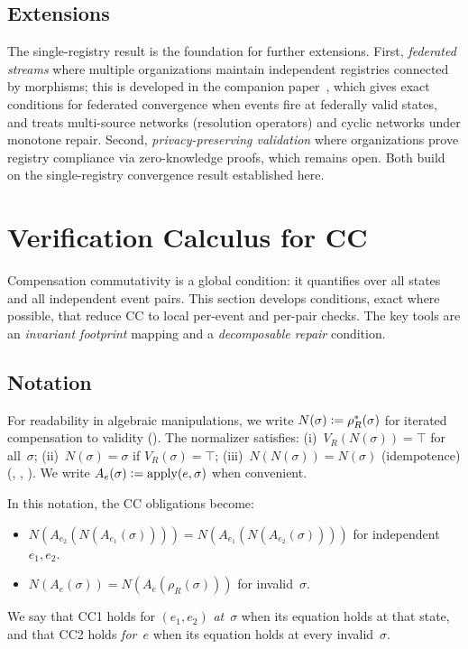 \documentclass[11pt,a4paper]{article}
\theoremstyle{plain}
\theoremstyle{definition}
\theoremstyle{remark}
\newcommand{\defeq}{\vcentcolon=}
\begin{document}
\subsection{Extensions}

The single-registry result is the foundation for further extensions.  First,
\emph{federated streams} where multiple organizations maintain independent
registries connected by morphisms; this is developed in the companion
paper~\cite{blackwell2026federated}, which gives exact conditions for
federated convergence when events fire at federally valid states, and treats
multi-source networks (resolution operators) and cyclic networks under
monotone repair.
Second, \emph{privacy-preserving validation} where organizations prove registry
compliance via zero-knowledge proofs, which remains open.  Both build on the
single-registry convergence result established here.

\section{Verification Calculus for CC}
\label{sec:calculus}

Compensation commutativity is a global condition: it quantifies over all states
and all independent event pairs.  This section develops conditions, exact
where possible, that reduce CC to local per-event and per-pair checks.  The key tools are an
\emph{invariant footprint} mapping and a \emph{decomposable repair} condition.

\subsection{Notation}

For readability in algebraic manipulations, we write
$N(\sigma) \defeq \rho_R^*(\sigma)$ for iterated compensation to validity
().  The normalizer satisfies: (i)~$V_R(N(\sigma)) = \top$
for all~$\sigma$; (ii)~$N(\sigma) = \sigma$ if $V_R(\sigma) = \top$;
(iii)~$N(N(\sigma)) = N(\sigma)$ (idempotence) (,
, ).  We write
$A_e(\sigma) \defeq \mathrm{apply}(e, \sigma)$ when convenient.

In this notation, the CC obligations become:
\begin{itemize}[leftmargin=*,nosep]
\item[\textbf{(CC1)}] $N(A_{e_2}(N(A_{e_1}(\sigma)))) =
  N(A_{e_1}(N(A_{e_2}(\sigma))))$ for independent $e_1, e_2$.
\item[\textbf{(CC2)}] $N(A_e(\sigma)) = N(A_e(\rho_R(\sigma)))$ for
  invalid~$\sigma$.
\end{itemize}
We say that CC1 holds for $(e_1, e_2)$ \emph{at}~$\sigma$ when its equation
holds at that state, and that CC2 holds \emph{for}~$e$ when its equation holds
at every invalid~$\sigma$.
\end{document}
